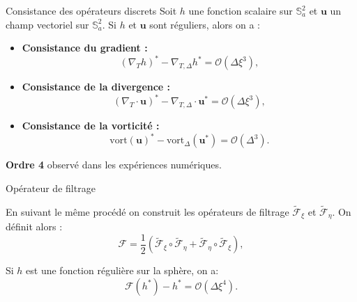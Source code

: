 \documentclass[11pt]{beamer}
\def\fxi{\tilde{\mathcal{F}}_{\xi}}
\def\feta{\tilde{\mathcal{F}}_{\eta}}
\begin{document}
\begin{frame}{Consistance des opérateurs discrets}
Soit $h$ une fonction scalaire sur $\mathbb{S}_a^2$ et $\mathbf{u}$ un champ vectoriel sur $\mathbb{S}_a^2$. Si $h$ et $\mathbf{u}$ sont réguliers, alors on a :
\begin{block}{}
\begin{itemize}
\item \textbf{Consistance du gradient :}
$$
(\nabla_T h)^* - \nabla_{T,\Delta} h^* = \mathcal{O}(\Delta \xi^3),
$$
\item \textbf{Consistance de la divergence :}
$$
(\nabla_T \cdot \mathbf{u})^* - \nabla_{T,\Delta} \cdot \mathbf{u}^* = \mathcal{O}(\Delta \xi^3),
$$
\item \textbf{Consistance de la vorticité :}
$$
\text{vort}(\mathbf{u})^* - \text{vort}_{\Delta}(\mathbf{u}^*) = \mathcal{O}(\Delta^3).
$$
\end{itemize}
\end{block}

\begin{alertblock}{}
\textbf{Ordre 4} observé dans les expériences numériques.
\end{alertblock}
\end{frame}








\begin{frame}{Opérateur de filtrage}

En suivant le même procédé on construit les opérateurs de filtrage $\fxi$ et $\feta$. On définit alors :
$$
\mathcal{F} = \dfrac{1}{2} \left( \fxi \circ \feta + \feta \circ \fxi \right),
$$

\begin{block}{}
Si $h$ est une fonction régulière sur la sphère, on a:
$$
\mathcal{F}(h^*) - h^* = \mathcal{O} \left( \Delta \xi^4 \right).
$$
\end{block}
\end{frame}
\end{document}
